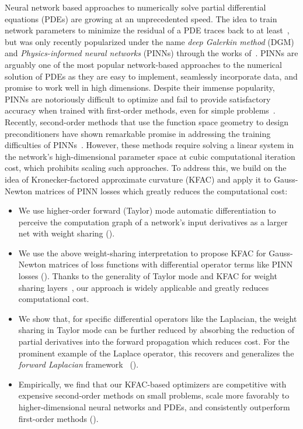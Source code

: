 Neural network based approaches to numerically solve partial differential equations (PDEs) are growing at an unprecedented speed.
The idea to train network parameters to minimize the residual of a PDE traces back to at least~\citet{dissanayake1994neural, lagaris1998artificial}, but was only recently popularized under the name \emph{deep Galerkin method} (DGM) and \emph{Physics-informed neural networks} (PINNs) through the works of~\citet{sirignano2018dgm, raissi2019physics}.
PINNs are arguably one of the most popular network-based approaches to the numerical solution of PDEs as they are easy to implement, seamlessly incorporate data, and promise to work well in high dimensions.
Despite their immense popularity, PINNs are notoriously difficult to optimize \citep{wang2021understanding} and fail to provide satisfactory accuracy when trained with first-order methods, even for simple problems~\citep{zeng2022competitive, muller2023achieving}.
Recently, second-order methods that use the function space geometry to design preconditioners have shown remarkable promise in addressing the training difficulties of PINNs~\citep{zeng2022competitive, muller2023achieving, de2023operator,jnini2024gauss, muller2024optimization}.
However, these methods require solving a linear system in the network's high-dimensional parameter space at cubic computational iteration cost, which prohibits scaling such approaches.
To address this, we build on the idea of Kronecker-factored approximate curvature (KFAC) and apply it to Gauss-Newton matrices of PINN losses which greatly reduces the computational cost:
\begin{itemize}
\item We use higher-order forward (Taylor) mode automatic differentiation to perceive the computation graph of a network's input derivatives as a larger net with weight sharing ().

\item We use the above weight-sharing interpretation to propose KFAC for Gauss-Newton matrices of loss functions with differential operator terms like PINN losses ().
  Thanks to the generality of Taylor mode and KFAC for weight sharing layers~\cite{eschenhagen2023kroneckerfactored}, our approach is widely applicable and greatly reduces computational cost.

\item We show that, for specific differential operators like the Laplacian, the weight sharing in Taylor mode can be further reduced by absorbing the reduction of partial derivatives into the forward propagation which reduces cost.
  For the prominent example of the Laplace operator, this recovers and generalizes the \emph{forward Laplacian} framework~\cite{li2023forward} ().

\item Empirically, we find that our KFAC-based optimizers are competitive with expensive second-order methods on small problems, scale more favorably to higher-dimensional neural networks and PDEs, and consistently outperform first-order methods ().
\end{itemize}

